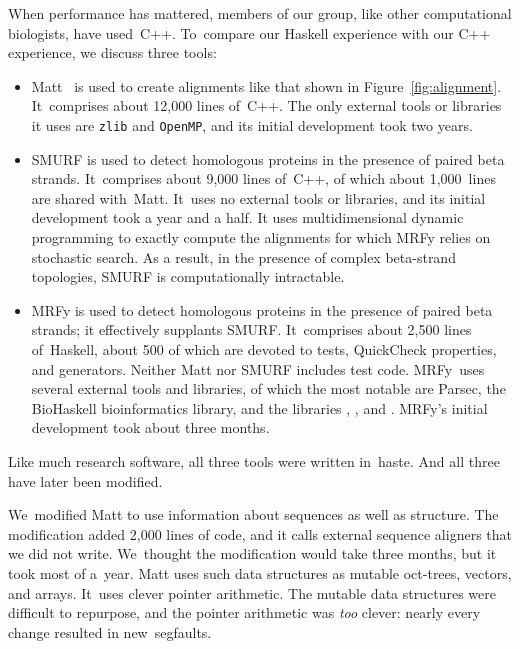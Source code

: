 \documentclass[]{jfp1}
\newcommand\mrfy{MRFy} %
\newcommand\figref[1]{Figure~\ref{fig:#1}}
\let\cite\citep
\begin{document}
When performance has mattered, members of our group, like other
computational biologists, have used~C++.
To~compare our Haskell experience with our C++ experience,
we discuss three tools:
\begin{itemize}
\item
Matt~\cite{Menke:2008wu} is used to create alignments like that shown
in \figref{alignment}.
It~comprises about 12,000 lines of~C++.
The only external tools or libraries it uses are \texttt{zlib}
and \texttt{OpenMP}, and its initial development took two years.
\item
SMURF
\cite{Menke:2010ti} is used to detect homologous proteins in the presence
of paired beta strands.
It~comprises about 9,000 lines of~C++, of which about 1,000~lines are
shared with~Matt.
It~uses no external tools or libraries, and
its initial development took a year and a half.
It uses multidimensional dynamic programming to exactly compute the alignments
for which MRFy relies on stochastic search.
As a result, in the presence of complex beta-strand topologies, SMURF is
computationally intractable.
\item
MRFy is used to detect homologous proteins in the presence of paired
beta strands; it effectively supplants SMURF.
It~comprises about 2,500 lines of~Haskell, about 500 of which are devoted
to tests, QuickCheck properties, and generators.
Neither Matt nor SMURF includes test code.
MRFy~uses several external tools and libraries, of which the most
notable are Parsec, the BioHaskell bioinformatics library, and
the libraries , ,
and .
\mrfy's initial development took about three months.
\end{itemize}
Like much research software, all three tools were written
 in~haste.
And all three have later been modified.

\ifpagetuning\enlargethispage{\baselineskip}\fi


We~modified Matt to use information about sequences as well as structure.
The modification added 2,000 lines of code, and it calls
external sequence aligners that we did not write.
We~thought the modification would take three months, 
but it took most of a~year.
Matt uses such
data structures as mutable oct-trees, vectors, and arrays.
It~uses clever pointer arithmetic.
The mutable data structures were difficult to 
repurpose, and the pointer arithmetic was \emph{too} clever: 
nearly every change resulted in new~segfaults.
\end{document}
